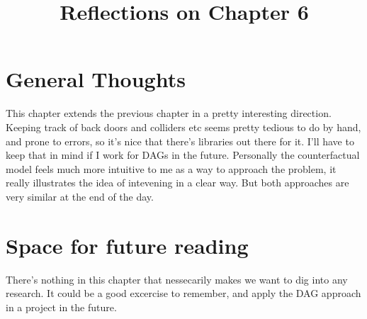 \documentclass[10pt, english]{article}
\begin{document}
\title{Reflections on Chapter 6}
\date{}
\author{}

\maketitle


\section*{General Thoughts}
This chapter extends the previous chapter in a pretty interesting direction. Keeping track of back doors and colliders etc seems pretty tedious to do by hand, and prone to errors, so it's nice that there's libraries out there for it. I'll have to keep that
in mind if I work for DAGs in the future. Personally the counterfactual model feels much more intuitive to me as a way to approach the problem, it really illustrates the idea of intevening in a clear way. But both approaches are very similar at the end of the day.


\section*{Space for future reading}
There's nothing in this chapter that nessecarily makes we want to dig into any research. It could be a good excercise to remember, and apply the DAG approach in a project in the future.
\end{document}
